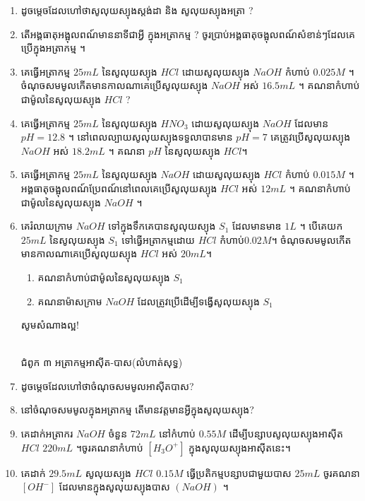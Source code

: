 \documentclass[12pt, a4paper]{article}
\begin{document}
\maketitle
\begin{enumerate}[m]
	\item ដូចម្តេចដែលហៅថាសូលុយស្យុងស្តង់ដា និង សូលុយស្យុងអត្រា ?
	\item តើអង្គធាតុអង្អុលពណ៍មាននាទីជាអ្វី ក្នុងអត្រាកម្ម ? ចូរប្រាប់អង្គធាតុចង្អុលពណ៍សំខាន់ៗដែលគេប្រើក្នុងអត្រាកម្ម ។
	\item គេធ្វើអត្រាកម្ម $25mL$ នៃសូលុយស្យុង $HCl$ ដោយសូលុយស្យុង $NaOH$ កំហាប់ $0.025M$ ។ ចំណុចសមមូលកើតមានកាលណាគេប្រើសូលុយស្យុង $NaOH$ អស់ $16.5mL$ ។ គណនាកំហាប់ជាម៉ូលនៃសូលុយស្យុង $HCl$ ?
	\item គេធ្វើអត្រាកម្ម $25mL$ នៃសូលុយស្យុង $HNO_3$ ដោយសូលុយស្យុង $NaOH$ ដែលមាន $pH=12.8$ ។ នៅពេលល្បាយសូលុយស្យុងទទួលាបានមាន $pH=7$ គេត្រូវប្រើសូលុយស្យុង $NaOH$ អស់ $18.2mL$ ។ គណនា $pH$ នៃសូលុយស្យុង $HCl$។
	\item គេធ្វើអត្រាកម្ម $25mL$ នៃសូលុយស្យុង $NaOH$ ដោយសូលុយស្យុង $HCl$ កំហាប់ $0.015M$ ។ អង្គធាតុចង្អុលពណ៍ប្រែពណ៍នៅពេលគេប្រើសូលុយស្យុង $HCl$ អស់ $12mL$ ។ គណនាកំហាប់ជាម៉ូលនៃសូលុយស្យុង $NaOH$ ។ 
	\item គេរំលាយក្រាម $NaOH$ ទៅក្នុងទឹកគេបានសូលុយស្យុង $S_1$ ដែលមានមាឌ $1L$ ។ បើគេយក $25mL$ នៃសូលុយស្យុង $S_1$ ទៅធ្វើអត្រាកម្មដោយ $HCl$ កំហាប់$0.02M$។ ចំណុចសមមូលកើតមានកាលណាគេប្រើសូលុយស្យុង $HCl$ អស់ $20mL$។
	\begin{enumerate}[k]
		\item គណនាកំហាប់ជាម៉ូលនៃសូលុយស្យុង $S_1$ 
		\item គណនាម៉ាសក្រាម $NaOH$ ដែលត្រូវប្រើដើម្បីទង្វើសូលុយស្យុង $S_1$
	\end{enumerate}
	\begin{center}
		\sffamily\color{black}
		សូមសំណាងល្អ!
	\end{center}\newpage
	\begin{center}
		\sffamily\color{black}
		\\
		ជំពូក ៣ អត្រាកម្មអាស៊ីត-បាស(លំហាត់សុទ្ធ)
	\end{center}
	\item ដូចម្តេចដែលហៅថាចំណុចសមមូលអាស៊ីតបាស?
	\item នៅចំណុចសមមូលក្នុងអត្រាកម្ម តើមានវត្តមានអ្វីក្នុងសូលុយស្យុង?
	\item គេដាក់អត្រាករ $NaOH$ ចំនួន $72mL$ នៅកំហាប់ $0.55M$ ដើម្បីបន្សាបសូលុយស្យុងអាស៊ីត $HCl$ $220mL$ ។ចូរគណនាកំហាប់ $[H_3O^+]$ ក្នុងសូលុយស្យុងអាស៊ីតនេះ។
	\item គេដាក់ $29.5mL$ សូលុយស្យុង $HCl$ $0.15M$ ធ្វើប្រតិកម្មបន្សាបជាមួយបាស $25mL$ ចូរគណនា $[OH^-]$ ដែលមានក្នុងសូលុយស្យុងបាស $(NaOH)$ ។

\end{enumerate}
\end{document}
